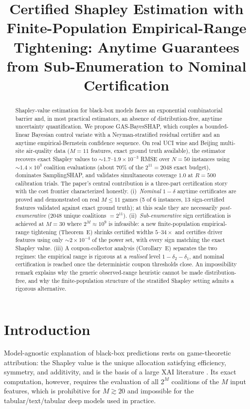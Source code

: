 \documentclass[11pt,twocolumn]{article}
\title{Certified Shapley Estimation with Finite-Population Empirical-Range Tightening: Anytime Guarantees from Sub-Enumeration to Nominal Certification}
\author{}
\date{}
\begin{document}
\maketitle

\begin{abstract}
\noindent
Shapley-value estimation for black-box models faces an exponential
combinatorial barrier and, in most practical estimators, an absence of
distribution-free, anytime uncertainty quantification.  We propose
GAS-BayesSHAP, which couples a bounded-linear Bayesian control variate with a
Neyman-stratified residual certifier and an anytime empirical-Bernstein
confidence sequence.  On real UCI wine and Beijing multi-site air-quality
data ($M=11$ features, exact ground truth available), the estimator recovers
exact Shapley values to $\sim\!1.7$--$1.9\times10^{-3}$ RMSE over $N=50$
instances using $\sim\!1.4\times10^3$ coalition evaluations (about $70\%$ of
the $2^{11}=2048$ exact budget), dominates SamplingSHAP, and validates
simultaneous coverage $1.0$ at $R=500$ calibration trials.  The paper's
central contribution is a three-part certification story with the cost
frontier characterized honestly.  (i)~\emph{Nominal} $1-\delta$ anytime
certificates are proved and demonstrated on real $M\le11$ games (5 of 6
instances, 13 sign-certified features validated against exact ground truth);
at this scale they are necessarily \emph{post-enumerative} (2048 unique
coalitions $=2^{11}$).  (ii)~\emph{Sub-enumerative} sign certification is
achieved at $M=30$ where $2^M\approx10^9$ is infeasible: a new
finite-population empirical-range tightening (Theorem~E) shrinks certified
widths $5$--$34\times$ and certifies driver features using only
$\sim\!2\times10^{-4}$ of the power set, with every sign matching the exact
Shapley value.  (iii) A coupon-collector analysis (Corollary~E) separates the
two regimes: the empirical range is rigorous at a \emph{realised} level
$1-\delta_2-\delta_1$, and nominal certification is reached once the
deterministic coupon thresholds close.  An impossibility remark explains why
the generic observed-range heuristic cannot be made distribution-free, and
why the finite-population structure of the stratified Shapley setting admits
a rigorous alternative.
\end{abstract}

\section{Introduction}\label{sec:intro}
Model-agnostic explanation of black-box predictions rests on game-theoretic
attribution: the Shapley value \cite{shapley1953} is the unique allocation
satisfying efficiency, symmetry, and additivity, and is the basis of a large
XAI literature \cite{lundberg2017,castro2009}.  Its exact computation,
however, requires the evaluation of all $2^M$ coalitions of the $M$ input
features, which is prohibitive for $M \gtrsim 20$ and impossible for the
tabular/text/tabular deep models used in practice.
\end{document}
